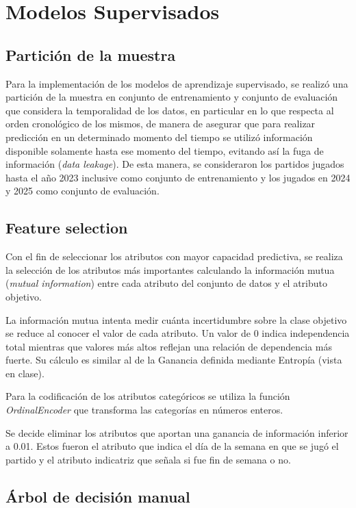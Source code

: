 \documentclass[conference]{IEEEtran}
\begin{document}
\section{Modelos Supervisados}

\subsection{Partición de la muestra}

Para la implementación de los modelos de aprendizaje supervisado, se realizó una partición de la muestra en conjunto de entrenamiento y conjunto de evaluación que considera la temporalidad de los datos, en particular en lo que respecta al orden cronológico de los mismos, de manera de asegurar que para realizar predicción en un determinado momento del tiempo se utilizó información disponible solamente hasta ese momento del tiempo, evitando así la fuga de información (\textit{data leakage}). De esta manera, se consideraron los partidos jugados hasta el año 2023 inclusive como conjunto de entrenamiento y los jugados en 2024 y 2025 como conjunto de evaluación.

\subsection{Feature selection}

Con el fin de seleccionar los atributos con mayor capacidad predictiva, se realiza la selección de los atributos más importantes calculando la información mutua (\textit{mutual information}) entre cada atributo del conjunto de datos y el atributo objetivo.

La información mutua intenta medir cuánta incertidumbre sobre la clase objetivo se reduce al conocer el valor de cada atributo. Un valor de 0 indica independencia total mientras que valores más altos reflejan una relación de dependencia más fuerte. Su cálculo es similar al de la Ganancia definida mediante Entropía (vista en clase).

Para la codificación de los atributos categóricos se utiliza la función \textit{OrdinalEncoder} que transforma las categorías en números enteros.

Se decide eliminar los atributos que aportan una ganancia de información inferior a 0.01. Estos fueron el atributo que indica el día de la semana en que se jugó el partido y el atributo indicatriz que señala si fue fin de semana o no.

\subsection{Árbol de decisión manual}
\end{document}

